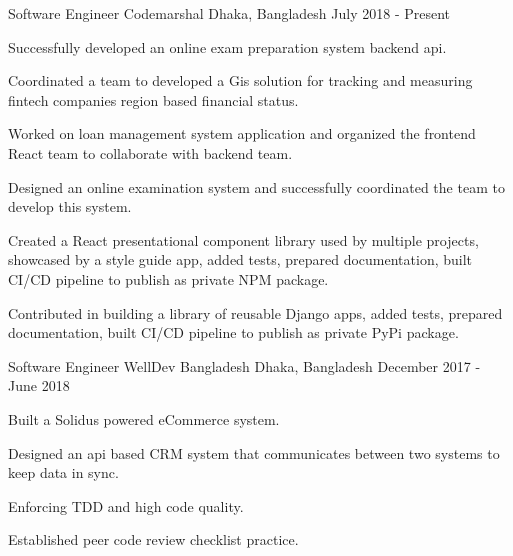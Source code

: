 \begin{cventries}

\cventry
    {Software Engineer}
    {Codemarshal}
    {Dhaka, Bangladesh}
    {July 2018 - Present}
    {
      \begin{cvitemsNumber}[Responsibilities:]
        \item {Successfully developed an online exam preparation system backend api.}
        \vspace{1mm}
        \item {Coordinated a team to developed a Gis solution for tracking and measuring fintech companies region based financial status.}
        \vspace{1mm}
        \item {Worked on loan management system application and organized the frontend React team to collaborate with backend team.}
        \vspace{1mm}
        \item {Designed an online examination system and successfully coordinated the team to develop this system.}
        \vspace{1mm}
        \item {Created a React presentational component library used by multiple projects, showcased by a style guide app, added tests, prepared documentation, built CI/CD pipeline to publish as private NPM package.}
        \vspace{1mm}
        \item {Contributed in building a library of reusable Django apps, added tests, prepared documentation, built CI/CD pipeline to publish as private PyPi package.}
        \vspace{1mm}
      \end{cvitemsNumber}
    }

\cventry
    {Software Engineer}
    {WellDev Bangladesh}
    {Dhaka, Bangladesh}
    {December 2017 - June 2018}
    {
      \begin{cvitemsNumber}[Responsibilities]
        \item {Built a Solidus powered eCommerce system.}
        \vspace{1mm}
        \item {Designed an api based CRM system that communicates between two systems to keep data in sync.}
        \vspace{1mm}
        \item {Enforcing TDD and high code quality.}
        \vspace{1mm}
        \item {Established peer code review checklist practice.}
        \vspace{1mm}
      \end{cvitemsNumber}
    }


\end{cventries}
